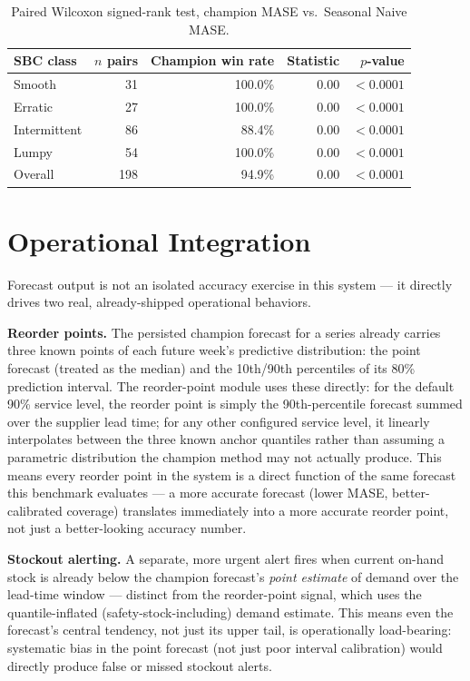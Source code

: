 \documentclass[11pt]{article}
\begin{document}
\begin{table}[htbp]
\centering
\begin{tabular}{lrrrr}
\toprule
SBC class & $n$ pairs & Champion win rate & Statistic & $p$-value \\
\midrule
Smooth & 31 & 100.0\% & 0.00 & $< 0.0001$ \\
Erratic & 27 & 100.0\% & 0.00 & $< 0.0001$ \\
Intermittent & 86 & 88.4\% & 0.00 & $< 0.0001$ \\
Lumpy & 54 & 100.0\% & 0.00 & $< 0.0001$ \\
\midrule
Overall & 198 & 94.9\% & 0.00 & $< 0.0001$ \\
\bottomrule
\end{tabular}
\caption{Paired Wilcoxon signed-rank test, champion MASE vs.\ Seasonal Naive MASE.}
\label{tab:wilcoxon}
\end{table}

\section{Operational Integration}
\label{sec:integration}

Forecast output is not an isolated accuracy exercise in this system --- it directly
drives two real, already-shipped operational behaviors.

\textbf{Reorder points.} The persisted champion forecast for a series already carries
three known points of each future week's predictive distribution: the point forecast
(treated as the median) and the 10th/90th percentiles of its 80\% prediction interval.
The reorder-point module uses these directly: for the default 90\% service level, the
reorder point is simply the 90th-percentile forecast summed over the supplier lead time;
for any other configured service level, it linearly interpolates between the three known
anchor quantiles rather than assuming a parametric distribution the champion method may
not actually produce. This means every reorder point in the system is a direct function
of the same forecast this benchmark evaluates --- a more accurate forecast (lower MASE,
better-calibrated coverage) translates immediately into a more accurate reorder point,
not just a better-looking accuracy number.

\textbf{Stockout alerting.} A separate, more urgent alert fires when current on-hand
stock is already below the champion forecast's \emph{point estimate} of demand over the
lead-time window --- distinct from the reorder-point signal, which uses the
quantile-inflated (safety-stock-including) demand estimate. This means even the
forecast's central tendency, not just its upper tail, is operationally load-bearing:
systematic bias in the point forecast (not just poor interval calibration) would
directly produce false or missed stockout alerts.
\end{document}
